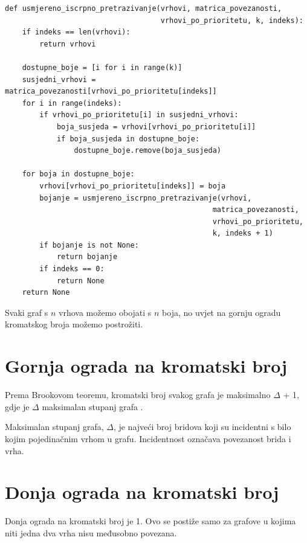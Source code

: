 \documentclass[times, utf8, zavrsni, numeric]{fer}
\begin{document}
\begin{lstlisting}[caption=Usmjereno iscrpno pretraživanje, label={lst:usmjereno iscrpno pretrazivanje}]
def usmjereno_iscrpno_pretrazivanje(vrhovi, matrica_povezanosti, 
                                    vrhovi_po_prioritetu, k, indeks):
    if indeks == len(vrhovi):
        return vrhovi
    
    dostupne_boje = [i for i in range(k)]
    susjedni_vrhovi = matrica_povezanosti[vrhovi_po_prioritetu[indeks]]
    for i in range(indeks):
        if vrhovi_po_prioritetu[i] in susjedni_vrhovi:
            boja_susjeda = vrhovi[vrhovi_po_prioritetu[i]]
            if boja_susjeda in dostupne_boje:
                dostupne_boje.remove(boja_susjeda)
    
    for boja in dostupne_boje:
        vrhovi[vrhovi_po_prioritetu[indeks]] = boja
        bojanje = usmjereno_iscrpno_pretrazivanje(vrhovi, 
                                                matrica_povezanosti, 
                                                vrhovi_po_prioritetu, 
                                                k, indeks + 1)
        if bojanje is not None:
            return bojanje
        if indeks == 0:
            return None
    return None
\end{lstlisting}

Svaki graf s $n$ vrhova možemo obojati s $n$ boja, no uvjet na gornju ogradu kromatskog broja možemo postrožiti.

\section{Gornja ograda na kromatski broj}
Prema Brookovom teoremu, kromatski broj svakog grafa je maksimalno $\Delta$ + 1, gdje je $\Delta$ maksimalan stupanj grafa \cite{cranston2015brooks}. 

Maksimalan stupanj grafa, $\Delta$, je najveći broj bridova koji su incidentni s bilo kojim pojedinačnim vrhom u grafu. Incidentnost označava povezanost brida i vrha.

\newpage
\section{Donja ograda na kromatski broj}
Donja ograda na kromatski broj je 1. Ovo se postiže samo za grafove u kojima niti jedna dva vrha nisu međusobno povezana.
\end{document}
